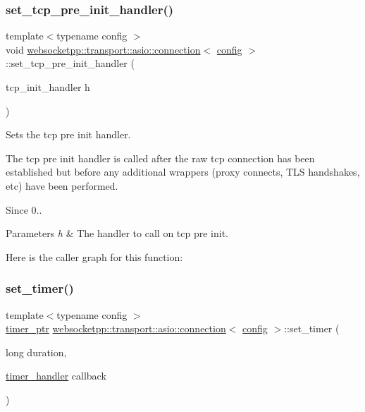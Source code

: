 \subsubsection{\texorpdfstring{set\+\_\+tcp\+\_\+pre\+\_\+init\+\_\+handler()}{set\_tcp\_pre\_init\_handler()}}
{\footnotesize\ttfamily template$<$typename config $>$ \\
void \mbox{\hyperlink{classwebsocketpp_1_1transport_1_1asio_1_1connection}{websocketpp\+::transport\+::asio\+::connection}}$<$ \mbox{\hyperlink{classconfig}{config}} $>$\+::set\+\_\+tcp\+\_\+pre\+\_\+init\+\_\+handler (\begin{DoxyParamCaption}\item[{tcp\+\_\+init\+\_\+handler}]{h }\end{DoxyParamCaption})\hspace{0.3cm}{\ttfamily [inline]}}



Sets the tcp pre init handler. 

The tcp pre init handler is called after the raw tcp connection has been established but before any additional wrappers (proxy connects, T\+LS handshakes, etc) have been performed.

\begin{DoxySince}{Since}
0..
\end{DoxySince}

\begin{DoxyParams}{Parameters}
{\em h} & The handler to call on tcp pre init. \\
\hline
\end{DoxyParams}
Here is the caller graph for this function\+:
\mbox{\label{classwebsocketpp_1_1transport_1_1asio_1_1connection_ab9db04550ee6b3dd2643cd7d23cda3f1}} 
\subsubsection{\texorpdfstring{set\+\_\+timer()}{set\_timer()}}
{\footnotesize\ttfamily template$<$typename config $>$ \\
\mbox{\hyperlink{classwebsocketpp_1_1transport_1_1asio_1_1connection_a96d8a6cd5cf1120208b206da109a194e}{timer\+\_\+ptr}} \mbox{\hyperlink{classwebsocketpp_1_1transport_1_1asio_1_1connection}{websocketpp\+::transport\+::asio\+::connection}}$<$ \mbox{\hyperlink{classconfig}{config}} $>$\+::set\+\_\+timer (\begin{DoxyParamCaption}\item[{long}]{duration,  }\item[{\mbox{\hyperlink{namespacewebsocketpp_1_1transport_a946cc56ff41139f3002149c15fd87bc9}{timer\+\_\+handler}}}]{callback }\end{DoxyParamCaption})\hspace{0.3cm}{\ttfamily [inline]}}



